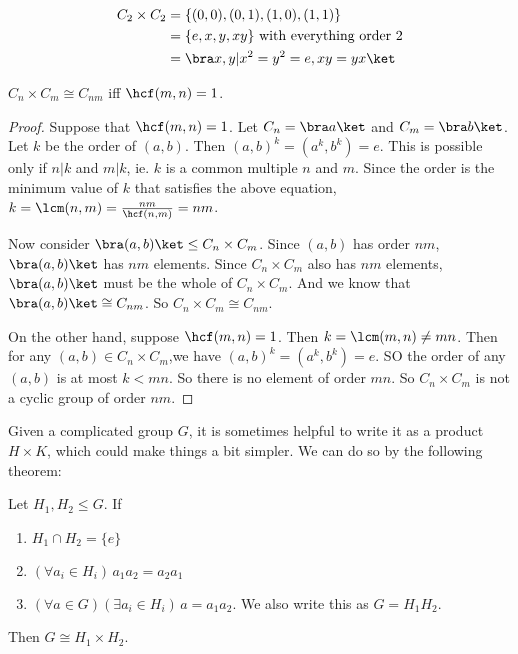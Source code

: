\documentclass[a4paper]{article}
\begin{document}
\begin{eg}
  \begin{align*}
    C_2\times C_2 &= \{(0, 0), (0, 1), (1, 0), (1, 1)\}\\
    &= \{e, x, y, xy\} \text{ with everything order 2}\\
    &= \bra x, y|x^2=y^2=e, xy = yx\ket
  \end{align*}
\end{eg}

\begin{prop}
  $C_n\times C_m\cong C_{nm}$ iff $\hcf(m, n) = 1$.
\end{prop}

\begin{proof}
  Suppose that $\hcf(m, n) = 1$. Let $C_n = \bra a\ket$ and $C_m = \bra b \ket$. Let $k$ be the order of $(a, b)$. Then $(a, b)^k = (a^k, b^k) = e$. This is possible only if $n | k$ and $m | k$, ie. $k$ is a common multiple $n$ and $m$. Since the order is the minimum value of $k$ that satisfies the above equation, $k = \lcm(n, m) = \frac{nm}{\hcf(n, m)} = nm$.

  Now consider $\bra (a, b)\ket \leq C_n\times C_m$. Since $(a, b)$ has order $nm$, $\bra (a, b)\ket$ has $nm$ elements. Since $C_n\times C_m$ also has $nm$ elements, $\bra (a, b)\ket$ must be the whole of $C_n\times C_m$. And we know that $\bra (a, b)\ket\cong C_{nm}$. So $C_n\times C_m \cong C_{nm}$.

  On the other hand, suppose $\hcf(m, n) = 1$. Then $k = \lcm(m, n) \not= mn$. Then for any $(a, b)\in C_n \times C_m$,we have $(a, b)^k = (a^k, b^k) = e$. SO the order of any $(a, b)$ is at most $k < mn$. So there is no element of order $mn$. So $C_n\times C_m$ is not a cyclic group of order $nm$.
\end{proof}

Given a complicated group $G$, it is sometimes helpful to write it as a product $H\times K$, which could make things a bit simpler. We can do so by the following theorem:
\begin{prop}
  Let $H_1, H_2\leq G$. If
  \begin{enumerate}
    \item $H_1\cap H_2 = \{e\}$
    \item $(\forall a_i\in H_i)\, a_1a_2=a_2a_1$
    \item $(\forall a\in G)(\exists a_i\in H_i)\,a = a_1a_2$. We also write this as $G=H_1H_2$.
  \end{enumerate}
  Then $G\cong H_1\times H_2$.
\end{prop}
\end{document}
